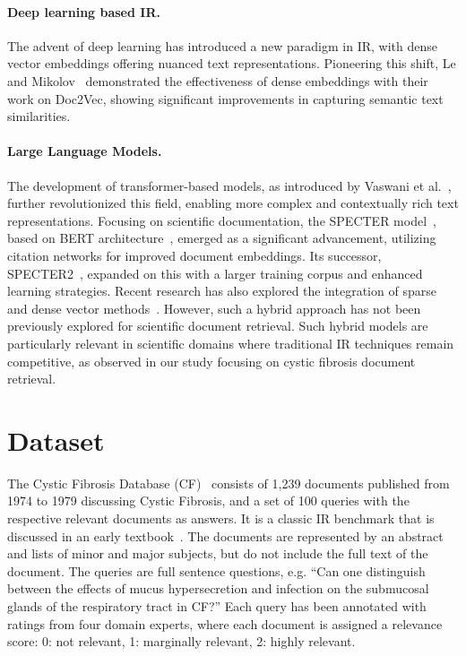 \documentclass[
]{ceurart}
\begin{document}
\vspace{-0.25em}
\paragraph{Deep learning based IR.} The advent of deep learning has introduced a new paradigm in IR, with dense vector embeddings offering nuanced text representations. Pioneering this shift, Le and Mikolov~\cite{le2014distributed} demonstrated the effectiveness of dense embeddings with their work on Doc2Vec, showing significant improvements in capturing semantic text similarities. 

\vspace{-0.25em}
\paragraph{Large Language Models.} The development of transformer-based models, as introduced by Vaswani et al.~\cite{vaswani2017attention}, further revolutionized this field, enabling more complex and contextually rich text representations. Focusing on scientific documentation, the SPECTER model~\cite{specter}, based on BERT architecture~\cite{devlin2019bert}, emerged as a significant advancement, utilizing citation networks for improved document embeddings. Its successor, SPECTER2~\cite{singh2023scirepeval}, expanded on this with a larger training corpus and enhanced learning strategies.
Recent research has also explored the integration of sparse and dense vector methods~\cite{arivazhagan2023hybrid,luan2021tacl}. However, such a hybrid approach has not been previously explored for scientific document retrieval. Such hybrid models are particularly relevant in scientific domains where traditional IR techniques remain competitive, as observed in our study focusing on cystic fibrosis document retrieval.


\section{Dataset}

The Cystic Fibrosis Database (CF)~\cite{cf-data} consists of 1,239 documents published from 1974 to 1979 discussing Cystic Fibrosis, and a set of 100 queries with the respective relevant documents as answers. It is a classic IR benchmark that is discussed in an early textbook~\cite{baeza-yates:book99}. The documents are represented by an abstract and lists of minor and major subjects, but do not include the full text of the document. The queries are full sentence questions, e.g. ``Can one distinguish between the effects of mucus hypersecretion and infection on the submucosal glands of the respiratory tract in CF?'' Each query has been annotated with ratings from four domain experts, where each document is assigned a relevance score: 0: not relevant, 1: marginally relevant, 2: highly relevant.  
\end{document}

